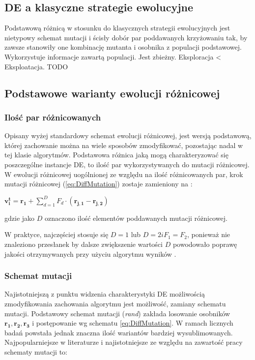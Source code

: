 \documentclass[12pt,a4paper]{report}
\begin{document}
{{\subsection{DE a klasyczne strategie ewolucyjne}
\par{
Podstawową różnicą w stosunku do klasycznych strategii ewolucyjnych jest nietypowy schemat mutacji i ścisły dobór par poddawanych krzyżowaniu tak, by zawsze stanowiły one kombinację mutanta i osobnika z populacji  podstawowej.
Wykorzystuje informacje zawartą populacji.
Jest zbieżny.
Eksploracja < Eksploatacja.
TODO
}


\subsection{Podstawowe warianty ewolucji różnicowej}
\subsubsection{Ilość par różnicowanych}
\par{
Opisany wyżej standardowy schemat ewolucji różnicowej, jest wersją podstawową, której zachowanie można na wiele sposobów zmodyfikować, pozostając nadal w tej klasie algorytmów. Podstawowa różnica jaką mogą charakteryzować się poszczególne instancje DE, to ilość par wykorzystywanych do mutacji różnicowej. W ewolucji różnicowej uogólnionej ze względu na ilość różnicowanych par, krok mutacji różnicowej (\ref{eq:DiffMutation}) zostaje zamieniony na \cite{PracticalInsights}:
\begin{center}
 $\mathbf{v_i^{t}} = \mathbf{r_1} + \sum_{d = 1}^D F_d \cdot (\mathbf{r_{j,1}} - \mathbf{r_{j,2}})$
\end{center}
gdzie jako $D$ oznaczono ilość elementów poddawanych mutacji różnicowej.
}
\par{
W praktyce, najczęściej stosuje się $D = 1$ lub $D = 2 i F_1 = F_2$, ponieważ nie znaleziono przesłanek by dalsze zwiększenie wartości $D$ powodowało poprawę jakości otrzymywanych przy użyciu algorytmu wyników \cite{PracticalInsights}.
\subsubsection{Schemat mutacji}
\par{
Najistotniejszą z punktu widzenia charakterystyki DE możliwością zmodyfikowania zachowania algorytmu jest możliwość, zamiany schematu mutacji. Podstawowy schemat mutacji (\emph{rand}) zakłada losowanie osobników $\mathbf{r_1}, \mathbf{r_2}, \mathbf{r_3}$ i postępowanie wg schematu \ref{eq:DiffMutation}. W ramach licznych badań powstała jednak znaczna ilość wariantów bardziej wysublimowanych. Najpopularniejsze w literaturze i najistotniejsze ze względu na zawartość pracy schematy mutacji to:
\begin{description}


\end{description}}}}}
\end{document}
